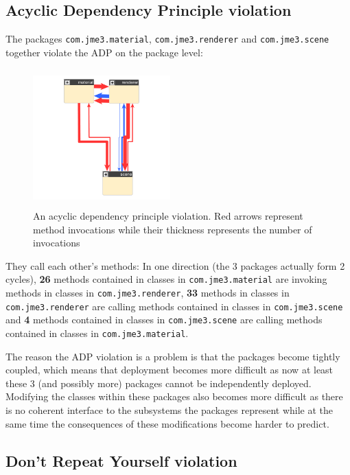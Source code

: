 \documentclass[a4paper, 10pt]{article}
\begin{document}
\subsection{Acyclic Dependency Principle violation}
\label{sec:adp_violation}

The packages \verb|com.jme3.material|, \verb|com.jme3.renderer| and
\verb|com.jme3.scene| together violate the ADP on the package level:

\begin{figure}
\includegraphics[width=200px, height=200px]{figures/adp-violation.png}
\caption{An acyclic dependency principle violation. Red arrows
  represent method invocations while their thickness represents the
  number of invocations}
\label{fig:adp-violation}
\end{figure}

They call each other's methods: In one direction (the 3 packages
actually form 2 cycles), \textbf{26} methods contained in classes in
\verb|com.jme3.material| are invoking methods in classes in
\verb|com.jme3.renderer|, \textbf{33} methods in classes in
\verb|com.jme3.renderer| are calling methods contained in classes in
\verb|com.jme3.scene| and \textbf{4} methods contained in classes in
\verb|com.jme3.scene| are calling methods contained in classes in
\verb|com.jme3.material|.

The reason the ADP violation is a problem is that the packages become
tightly coupled, which means that deployment becomes more difficult as
now at least these 3 (and possibly more) packages cannot be
independently deployed.
Modifying the classes within these packages also becomes more
difficult as there is no coherent interface to the subsystems the
packages represent while at the same time the consequences of these
modifications become harder to predict.\\

\subsection{Don't Repeat Yourself violation}
\label{sec:dry_violation}
\end{document}
